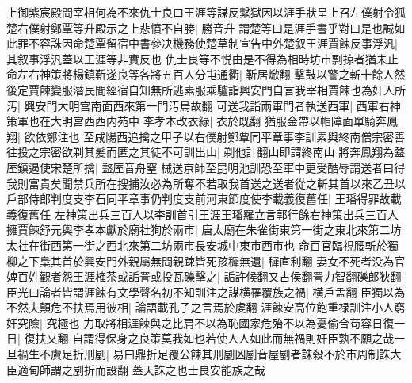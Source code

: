 上御紫宸殿問宰相何為不來仇士良曰王涯等謀反繫獄因以涯手狀呈上召左僕射令狐楚右僕射鄭覃等升殿示之上悲憤不自勝|{
	勝音升}
謂楚等曰是涯手書乎對曰是也誠如此罪不容誅因命楚覃留宿中書參决機務使楚草制宣告中外楚叙王涯賈餗反事浮汎|{
	其叙事浮汎蓋以王涯等非實反也}
仇士良等不悦由是不得為相時坊市剽掠者猶未止命左右神策將楊鎮靳遂良等各將五百人分屯通衢|{
	靳居焮翻}
擊鼓以警之斬十餘人然後定賈餗變服潛民間經宿自知無所逃素服乘驢詣興安門自言我宰相賈餗也為奸人所汚|{
	興安門大明宫南面西來第一門汚烏故翻}
可送我詣兩軍門者執送西軍|{
	西軍右神策軍也在大明宫西西内苑中}
李孝本改衣緑|{
	衣於既翻}
猶服金帶以帽障面單騎奔鳳翔|{
	欲依鄭注也}
至咸陽西追擒之甲子以右僕射鄭覃同平章事李訓素與終南僧宗密善往投之宗密欲剃其髪而匿之其徒不可訓出山|{
	剃他計翻山即謂終南山}
將奔鳳翔為盩厔鎮遏使宋楚所擒|{
	盩厔音舟窒}
械送京師至昆明池訓恐至軍中更受酷辱謂送者曰得我則富貴矣聞禁兵所在搜捕汝必為所奪不若取我首送之送者從之斬其首以來乙丑以戶部侍郎判度支李石同平章事仍判度支前河東節度使李載義復舊任|{
	王璠得罪故載義復舊任}
左神策出兵三百人以李訓首引王涯王璠羅立言郭行餘右神策出兵三百人擁賈餗舒元輿李孝本獻於廟社狥於兩市|{
	唐太廟在朱雀街東第一街之東北來第二坊太社在街西第一街之西北來第二坊兩市長安城中東市西市也}
命百官臨視腰斬於獨柳之下梟其首於興安門外親屬無問親踈皆死孩穉無遺|{
	穉直利翻}
妻女不死者没為官婢百姓觀者怨王涯榷茶或詬詈或投瓦礫擊之|{
	詬許候翻又古侯翻詈力智翻礫郎狄翻}
臣光曰論者皆謂涯餗有文學聲名初不知訓注之謀横罹覆族之禍|{
	横戶孟翻}
臣獨以為不然夫顛危不扶焉用彼相|{
	論語載孔子之言焉於䖍翻}
涯餗安高位飽重禄訓注小人窮奸究險|{
	究極也}
力取將相涯餗與之比肩不以為恥國家危殆不以為憂偷合苟容日復一日|{
	復扶又翻}
自謂得保身之良策莫我如也若使人人如此而無禍則奸臣孰不願之哉一旦禍生不虞足折刑剭|{
	易曰鼎折足覆公餗其刑剭凶剭音屋剭者誅殺不於市周制誅大臣適甸師謂之剭折而設翻}
蓋天誅之也士良安能族之哉

